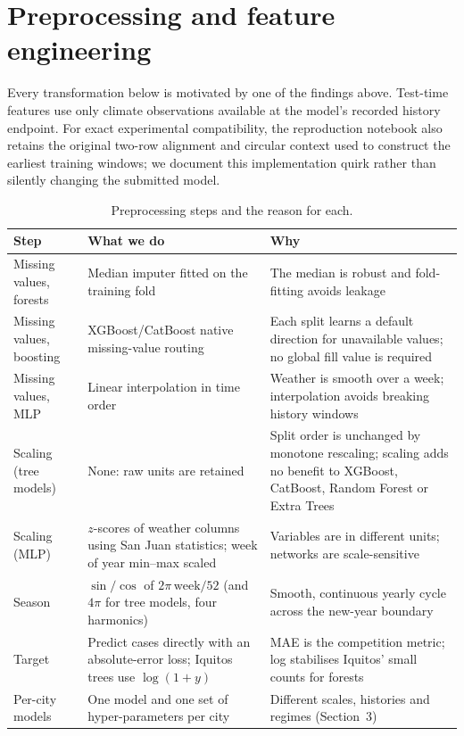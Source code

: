 \documentclass[11pt,a4paper]{article}
\begin{document}
\section{Preprocessing and feature engineering}
Every transformation below is motivated by one of the findings above. Test-time features use only climate observations available at the model's recorded history endpoint. For exact experimental compatibility, the reproduction notebook also retains the original two-row alignment and circular context used to construct the earliest training windows; we document this implementation quirk rather than silently changing the submitted model.

\begin{table}[H]
\centering
\caption{Preprocessing steps and the reason for each.}
\label{tab:prep}
\small
\begin{tabular}{>{\raggedright\arraybackslash}p{3.2cm}>{\raggedright\arraybackslash}p{5.3cm}>{\raggedright\arraybackslash}p{6cm}}
\toprule
\textbf{Step} & \textbf{What we do} & \textbf{Why}\\
\midrule
Missing values, forests & Median imputer fitted on the training fold & The median is robust and fold-fitting avoids leakage\\
Missing values, boosting & XGBoost/CatBoost native missing-value routing & Each split learns a default direction for unavailable values; no global fill value is required\\
Missing values, MLP & Linear interpolation in time order & Weather is smooth over a week; interpolation avoids breaking history windows\\
Scaling (tree models) & None: raw units are retained & Split order is unchanged by monotone rescaling; scaling adds no benefit to XGBoost, CatBoost, Random Forest or Extra Trees\\
Scaling (MLP) & $z$-scores of weather columns using San Juan statistics; week of year min--max scaled & Variables are in different units; networks are scale-sensitive\\
Season & $\sin/\cos$ of $2\pi\,\mathrm{week}/52$ (and $4\pi$ for tree models, four harmonics) & Smooth, continuous yearly cycle across the new-year boundary\\
Target & Predict cases directly with an absolute-error loss; Iquitos trees use $\log(1{+}y)$ & MAE is the competition metric; log stabilises Iquitos' small counts for forests\\
Per-city models & One model and one set of hyper-parameters per city & Different scales, histories and regimes (Section~3)\\
\bottomrule
\end{tabular}
\end{table}
\end{document}

